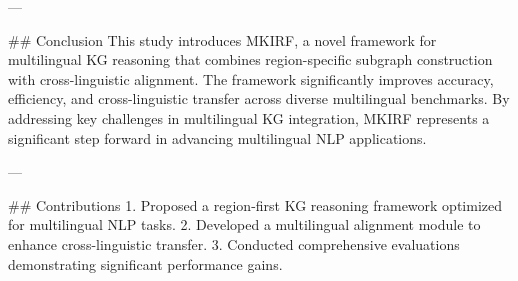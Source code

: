 ---

## Conclusion
This study introduces MKIRF, a novel framework for multilingual KG reasoning that combines region-specific subgraph construction with cross-linguistic alignment. The framework significantly improves accuracy, efficiency, and cross-linguistic transfer across diverse multilingual benchmarks. By addressing key challenges in multilingual KG integration, MKIRF represents a significant step forward in advancing multilingual NLP applications.

---

## Contributions
1. Proposed a region-first KG reasoning framework optimized for multilingual NLP tasks.
2. Developed a multilingual alignment module to enhance cross-linguistic transfer.
3. Conducted comprehensive evaluations demonstrating significant performance gains.